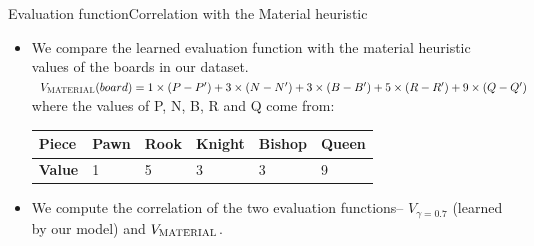 \documentclass[9pt, unknownkeysallowed]{beamer}
\begin{document}
\begin{frame}{Evaluation function}{Correlation with the Material heuristic}
\begin{itemize}
 \item We compare the learned evaluation function with the material heuristic 
values of the boards in our dataset.\\
$V_{\textsc{MATERIAL}}(board) = 1 \times (P-P') + 3 \times (N-N')+ 3 
\times (B-B') + 5 \times (R-R')+ 9 \times (Q-Q')$
where the values of P, N, B, R and Q come from:
\begin{table}[H]
\tiny
\centering
\begin{tabular}{@{}llllll@{}}
\toprule
{\bf Piece} & Pawn & Rook & Knight  & Bishop & Queen \\ \midrule
{\bf Value} & 1    & 5    & 3	    & 3      & 9     \\ \bottomrule
\end{tabular}
\end{table}
\item We compute the correlation of the two evaluation 
functions-- $V_{\gamma=0.7}$ (learned by our model) and $V_{\textsc{MATERIAL}}$.
\end{itemize}
 
\end{frame}
\end{document}
